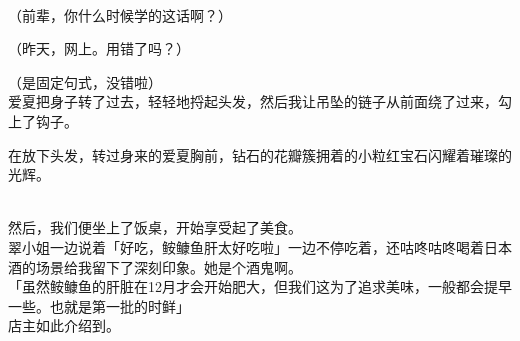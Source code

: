 
\\

（前辈，你什么时候学的这话啊？）

（昨天，网上。用错了吗？）

（是固定句式，没错啦）\\

爱夏把身子转了过去，轻轻地捋起头发，然后我让吊坠的链子从前面绕了过来，勾上了钩子。

在放下头发，转过身来的爱夏胸前，钻石的花瓣簇拥着的小粒红宝石闪耀着璀璨的光辉。\\


\\

然后，我们便坐上了饭桌，开始享受起了美食。\\

翠小姐一边说着「好吃，𩽾𩾌鱼肝太好吃啦」一边不停吃着，还咕咚咕咚喝着日本酒的场景给我留下了深刻印象。她是个酒鬼啊。\\

「虽然𩽾𩾌鱼的肝脏在12月才会开始肥大，但我们这为了追求美味，一般都会提早一些。也就是第一批的时鲜」\\

店主如此介绍到。

